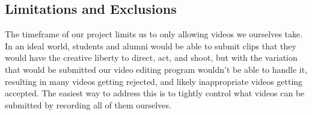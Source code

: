 \subsection{Limitations and Exclusions}
The timeframe of our project limits us to only allowing videos 
we ourselves take. In an ideal world, students and alumni would 
be able to submit clips that they would have the creative liberty 
to direct, act, and shoot, but with the variation that would be
submitted our video editing program wouldn't be able to handle it,
resulting in many videos getting rejected, and likely inappropriate
videos getting accepted. The easiest way to address this is to
tightly control what videos can be submitted by recording all of
them ourselves.